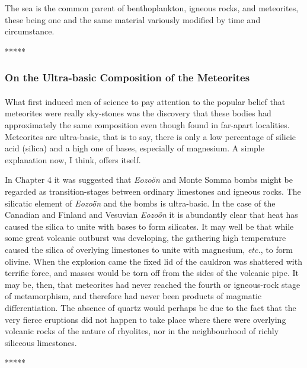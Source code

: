 \documentclass[a4paper, 12pt, oneside]{article}
\begin{document}
The sea is the common parent of benthoplankton, igneous rocks, and meteorites, these being one and the same material variously modified by time and circumstance.

\centerline{*\hspace{15mm}*\hspace{15mm}*\hspace{15mm}*\hspace{15mm}*}
\bigskip

\subsubsection{On the Ultra-basic Composition of the Meteorites}
\paragraph{}
What first induced men of science to pay attention to the popular belief that meteorites were really sky-stones was the discovery that these bodies had approximately the same composition even though found in far-apart localities. Meteorites are ultra-basic, that is to say, there is only a low percentage of silicic acid (silica) and a high one of bases, especially of magnesium. A simple explanation now, I think, offers itself.

In Chapter 4 it was suggested that \emph{Eozoön} and Monte Somma bombs might be regarded as transition-stages between ordinary limestones and igneous rocks. The silicatic element of \emph{Eozoön} and the bombs is ultra-basic. In the case of the Canadian and Finland and Vesuvian \emph{Eozoön} it is abundantly clear that heat has caused the silica to unite with bases to form silicates. It may well be that while some great volcanic outburst was developing, the gathering high temperature caused the silica of overlying limestones to unite with magnesium, \emph{etc.}, to form olivine. When the explosion came the fixed lid of the cauldron was shattered with terrific force, and masses would be torn off from the sides of the volcanic pipe. It may be, then, that meteorites had never reached the fourth or igneous-rock stage of metamorphism, and therefore had never been products of magmatic differentiation. The absence of quartz would perhaps be due to the fact that the very fierce eruptions did not happen to take place where there were overlying volcanic rocks of the nature of rhyolites, nor in the neighbourhood of richly siliceous limestones.

\centerline{*\hspace{15mm}*\hspace{15mm}*\hspace{15mm}*\hspace{15mm}*}
\bigskip
\end{document}
